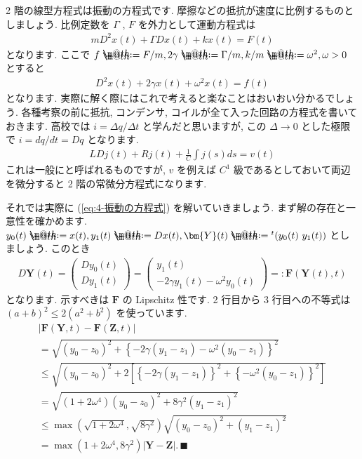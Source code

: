 \documentclass[openany, a4paper, oneside]{jsbook}
\makeatletter
\newcommand*{\defeq}{\mathrel{\rlap{%
\raisebox{0.3ex}{$\m@th\cdot$}}%
\raisebox{-0.3ex}{$\m@th\cdot$}}%
=}
\theoremstyle{break}
\theoremstyle{breakdefn}
\newcommand{\abs}[1]{\left|#1\right|}
\makeatother
\begin{document}
2 階の線型方程式は振動の方程式です.
摩擦などの抵抗が速度に比例するものとしましょう.
比例定数を $\Gamma$ ,  $F$ を外力として運動方程式は
\begin{gather}
m D^2 x (t) + \Gamma D x (t) + k x (t) = F (t)
\end{gather}
となります.
ここで $f \defeq F/m , 2 \gamma \defeq \Gamma / m , k/m \defeq \omega^2 , \omega>0$ とすると
\begin{gather}
D^2 x (t) + 2 \gamma x (t) + \omega^2 x (t) = f (t)
\label{eq:4-振動の方程式}
\end{gather}
となります.
実際に解く際にはこれで考えると楽なことはおいおい分かるでしょう.
各種考察の前に抵抗, コンデンサ, コイルが全て入った回路の方程式を書いておきます.
高校では $i = \varDelta q / \varDelta t$ と学んだと思いますが,
この $\varDelta \to 0$ とした極限で $i = dq / dt = D q$ となります.
\begin{gather}
L D j (t) + R j (t) + \frac{1}{C} \int j (s) ds = v (t)
\end{gather}
これは一般にと呼ばれるものですが,
$v$ を例えば $C^1$ 級であるとしておいて両辺を微分すると 2 階の常微分方程式になります.

それでは実際に (\ref{eq:4-振動の方程式}) を解いていきましょう.
まず解の存在と一意性を確かめます.
$y_0 (t) \defeq x (t) , y_1 (t) \defeq Dx (t) , \bm{Y}(t) \defeq {^t}( y_0 (t) \,\, y_1 (t) )$ としましょう.
このとき
\begin{gather}
D \bm{Y}(t)
=
\begin{pmatrix}
D y_0 (t) \\
D y_1 (t)
\end{pmatrix}
=
\begin{pmatrix}
y_1 (t) \\
-2 \gamma y_1 (t) - \omega ^2 y_0 (t)
\end{pmatrix}
=:
\bm{F}(\bm{Y}(t) ,t)
\end{gather}
となります.
示すべきは $\bm{F}$ の Lipschitz 性です.
2 行目から 3 行目への不等式は $( a + b )^2 \leq 2 ( a^2 + b^2 )$ を使っています.
\begin{gather}
\abs{\bm{F}(\bm{Y},t) - \bm{F}( \bm{Z}, t )} \\
=
\sqrt{ ( y_0 - z_0 )^2 + \left \{ -2\gamma ( y_1 - z_1 ) - \omega ^2 ( y_0 - z_1 ) \right \} ^2 } \\
\leq
\sqrt{ ( y_0 - z_0 )^2 +
2 \left[ \left \{ -2\gamma ( y_1 - z_1 ) \right \} ^2 + \left \{ - \omega ^2 ( y_0 - z_1 ) \right \} ^2 \right ] } \\
=
\sqrt{ ( 1 + 2 \omega ^4 ) ( y_0 - z_0 )^2 + 8 \gamma ^2 ( y_1 - z_1 ) ^2 } \\
\leq
\max \left ( \sqrt{ 1 + 2 \omega ^4 } , \sqrt{ 8 \gamma ^2 } \right) \sqrt{ ( y_0 - z_0 )^2 + ( y_1 - z_1 ) ^2 } \\
=
\max ( 1 + 2 \omega ^4 , 8 \gamma ^2 ) | \bm{Y} - \bm{Z} | . \, \blacksquare
\end{gather}
\end{document}
